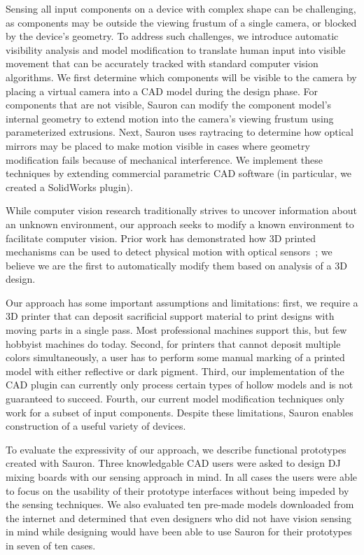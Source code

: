 Sensing all input components on a device with complex shape can be challenging, as components may be outside the viewing frustum of a single camera, or blocked by the device's geometry. To address such challenges, we introduce automatic visibility analysis and model modification 
to translate human input into visible movement that can be accurately tracked with standard computer vision algorithms. We first determine which components will be visible to the camera by placing a virtual camera into a CAD model during the design phase. For components that are not visible, Sauron can modify the component model's internal geometry to extend motion into the camera's viewing frustum using parameterized extrusions. Next, Sauron uses raytracing to determine how optical mirrors may be placed to make motion visible in cases where geometry modification fails because of mechanical interference. We implement these techniques by extending commercial parametric CAD software (in particular, we created a SolidWorks plugin).

While computer vision research traditionally strives to uncover information about an unknown environment, our approach seeks to modify a known environment to facilitate computer vision. Prior work has demonstrated how 3D printed mechanisms can be used to detect physical motion with optical sensors~\cite{willis-printedoptics}; we believe we are the first to automatically modify them based on analysis of a 3D design.

Our approach has some important assumptions and limitations: first, we require a 3D printer that can deposit sacrificial support material to print designs with moving parts in a single pass. Most professional machines support this, but few hobbyist machines do today. Second, for printers that cannot deposit multiple colors simultaneously, a user has to perform some manual marking of a printed model with either reflective or dark pigment. Third, our implementation of the CAD plugin can currently only process certain types of hollow models and is not guaranteed to succeed. Fourth, our current model modification techniques only work for a subset of input components. Despite these limitations, Sauron enables construction of a useful variety of devices.

To evaluate the expressivity of our approach, we describe functional prototypes created with Sauron. 
Three knowledgable CAD users were asked to %
design DJ mixing boards with our sensing approach in mind. In all cases the users were able to focus on the usability of their prototype interfaces without being impeded by the sensing techniques. We also evaluated ten pre-made models downloaded from the internet and determined that even designers who did not have vision sensing in mind while designing would have been able to use Sauron for their prototypes in seven of ten cases.

